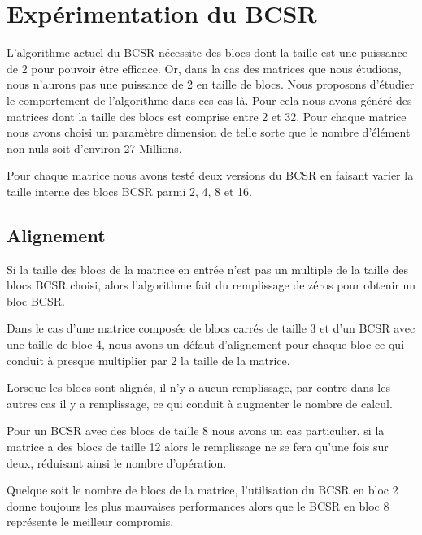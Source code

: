 \documentclass[a4paper,11pt]{report}
\begin{document}
\chapter{Expérimentation du BCSR}
 \label{BCSR_bloc_size}
 L'algorithme actuel du BCSR nécessite des blocs dont la taille est
 une puissance de 2 pour pouvoir être efficace. Or, dans la cas des
 matrices que nous étudions, nous n'aurons pas une puissance de 2 en
 taille de blocs. Nous proposons d'étudier le
 comportement de l'algorithme dans ces cas là. Pour cela nous avons
 généré des matrices dont la taille des blocs est comprise entre 2 et
 32. Pour chaque matrice nous avons choisi un paramètre dimension de
 telle sorte que le nombre d'élément non nuls soit d'environ 27
 Millions.

 Pour chaque matrice nous avons testé deux versions du BCSR en faisant
 varier la taille interne des blocs BCSR parmi 2, 4, 8 et 16.
 
 \section{Alignement}
  Si la taille des blocs de la matrice en entrée n'est pas un multiple
  de la taille des blocs BCSR choisi, alors l'algorithme fait du
  remplissage de zéros pour obtenir un bloc BCSR.

  
  Dans le cas d'une matrice composée de blocs carrés de taille 3 et d'un
  BCSR avec une taille de bloc 4, nous avons un défaut d'alignement
  pour chaque bloc ce qui conduit à presque multiplier par 2 la taille
  de la matrice.
  
  
  Lorsque les blocs sont alignés, il n'y a aucun remplissage, par
  contre dans les autres cas il y a remplissage, ce qui conduit à
  augmenter le nombre de calcul.

  Pour un BCSR avec des blocs de taille 8 nous avons un cas
  particulier, si la matrice a des blocs de taille 12 alors le
  remplissage ne se fera qu'une fois sur deux, réduisant ainsi le
  nombre d'opération.

  Quelque soit le nombre de blocs de la matrice, l'utilisation du BCSR
  en bloc 2 donne toujours les plus mauvaises performances alors que
  le BCSR en bloc 8 représente le meilleur compromis.
\end{document}
